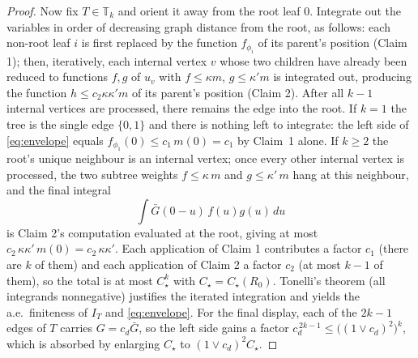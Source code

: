 \documentclass[10pt,a4paper]{amsart}
\newcommand{\T}{\mathbb{T}}                    %
\begin{document}
\begin{proof}
Now fix $T\in\T_k$ and orient it away from the root leaf $0$. Integrate out
the variables in order of decreasing graph distance from the root, as
follows: each non-root leaf $i$ is first replaced by the function
$f_{\phi_i}$ of its parent's position (Claim 1); then, iteratively, each
internal vertex $v$ whose two children have already been reduced to
functions $f,g$ of $u_v$ with $f\le\kappa m$, $g\le\kappa'm$ is integrated
out, producing the function $h\le c_2\kappa\kappa' m$ of its parent's
position (Claim 2). After all $k-1$ internal vertices are processed, there
remains the edge into the root. If $k=1$ the tree is the single edge
$\{0,1\}$ and there is nothing left to integrate: the left side of
\eqref{eq:envelope} equals $f_{\phi_1}(0)\le c_1\,m(0)=c_1$ by Claim~1
alone. If $k\ge2$ the root's unique neighbour is an internal vertex; once
every other internal vertex is processed, the two subtree weights
$f\le\kappa\,m$ and $g\le\kappa'\,m$ hang at this neighbour, and the final
integral
\[
\int \bar G(0-u)\,f(u)g(u)\,du
\]
is Claim 2's computation evaluated at the root, giving at most
$c_2\,\kappa\kappa'\,m(0)=c_2\,\kappa\kappa'$. Each application of
Claim 1 contributes a factor $c_1$ (there are $k$ of them) and each
application of Claim 2 a factor $c_2$ (at most $k-1$ of them), so the total
is at most $C_\star^k$ with $C_\star=C_\star(R_0)$. Tonelli's
theorem (all integrands nonnegative) justifies the iterated integration and
yields the a.e.\ finiteness of $I_T$ and \eqref{eq:envelope}. For the final
display, each of the $2k-1$ edges of $T$ carries $G=c_d\bar G$, so the left
side gains a factor $c_d^{\,2k-1}\le\bigl((1\vee c_d)^{2}\bigr)^{k}$, which is
absorbed by enlarging $C_\star$ to $(1\vee c_d)^{2}C_\star$.
\end{proof}
\end{document}
